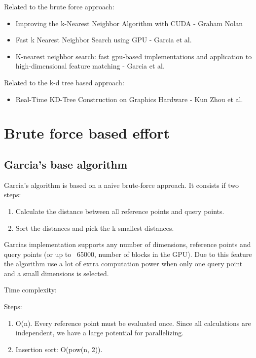 Related to the brute force approach:
\begin{itemize}
    \item Improving the k-Nearest Neighbor Algorithm with CUDA - Graham Nolan
    \item Fast k Nearest Neighbor Search using GPU - Garcia et al.
    \item K-nearest neighbor search: fast gpu-based implementations and application to high-dimensional feature matching - Garcia et al.
\end{itemize}

Related to the k-d tree based approach:
\begin{itemize}
    \item Real-Time KD-Tree Construction on Graphics Hardware - Kun Zhou et al.
\end{itemize}


\section{Brute force based effort} %
\label{sub:brute_force_based_effort}

\subsection{Garcia's base algorithm} %
\label{ssub:garcias_base_algorithme}

Garcia's algorithm is based on a naive brute-force approach. It consists if two steps:
\begin{enumerate}
    \item Calculate the distance between all reference points and query points.
    \item Sort the distances and pick the k smallest distances.
\end{enumerate}

Garcias implementation supports any number of dimensions, reference points and query points (or up to ~65000, number of blocks in the GPU). Due to this feature the algorithm use a lot of extra computation power when only one query point and a small dimensions is selected.

Time complexity:

Steps:

\begin{enumerate}
    \item O(n). Every reference point must be evaluated once. Since all calculations are independent, we have a large potential for parallelizing.
    \item Insertion sort: O(pow(n, 2)).
\end{enumerate}

